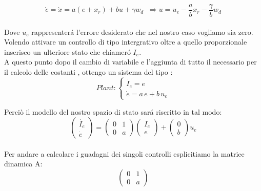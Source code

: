 \documentclass[a4paper,13pt]{article}
\begin{document}
\begin{equation*}
	\dot{e}=\dot{x}=a(e+x_{r})+bu+\gamma w_{d}\,\,\:           %
	\Rightarrow u=u_e-\frac{a}{b} x_{r}-\frac{\gamma}{b} w_{d}
\end{equation*} \\
Dove $u_e$ rappresenter\'a l'errore desiderato che nel nostro caso vogliamo sia zero.\\
Volendo attivare un controllo di tipo intergrativo oltre a quello proporzionale
inserisco un ulteriore stato che chiamer\'o $I_e$.\\
A questo punto dopo il cambio di variabile e l'aggiunta di tutto il necessario
per il calcolo delle costanti , ottengo un sistema del tipo :
\[Plant	:
\begin{cases}
	
	\dot{I_{e}}= e \\
	\dot{e} = a\,e + b\,u_e
	
\end{cases}\]

Perciò il modello del nostro spazio di stato sar\'a riscritto in tal modo:
\begin{equation*}	
\begin{pmatrix}
	
	\dot{I_{e}} \\ \dot{e}
	
\end{pmatrix} =         %
\begin{pmatrix}

	0&1\\0&a

\end{pmatrix}
\begin{pmatrix}

	I_{e}\\e

\end{pmatrix} +           %
\begin{pmatrix}

	0\\b

\end{pmatrix} u_e
\end{equation*} \\
Per andare a calcolare i guadagni dei singoli controlli esplicitiamo la matrice dinamica A:        %
\begin{equation*}
\begin{pmatrix}

	0&1\\0&a

\end{pmatrix}
\end{equation*} \\
\end{document}
